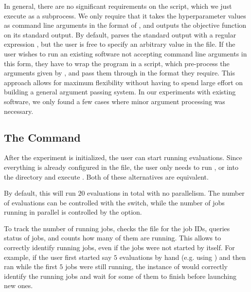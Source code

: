 In general, there are no significant requirements on the script, which we just execute as a subprocess. We only require that it takes the hyperparameter values as command line arguments in the format of , and outputs the objective function on its standard output. By default, \bopt parses the standard output with a regular expression , but the user is free to specify an arbitrary value in the  file. If the user wishes to run an existing software not accepting command line arguments in this form, they have to wrap the program in a script, which pre-process the arguments given by \bopt, and pass them through in the format they require. This approach allows for maximum flexibility without having to spend large effort on building a general argument passing system. In our experiments with existing software, we only found a few cases where minor argument processing was necessary.

\subsection{The  Command}

After the experiment is initialized, the user can start running evaluations. Since everything is already configured in the  file, the user only needs to run , or  into the directory and execute . Both of these alternatives are equivalent.

By default, this will run $20$ evaluations in total with no parallelism. The number of evaluations can be controlled with the  switch, while the number of jobs running in parallel is controlled by the  option.

To track the number of running jobs,  checks the  file for the job IDs, queries status of jobs, and counts how many of them are running. This allows  to correctly identify running jobs, even if the jobs were not started by  itself. For example, if the user first started say $5$ evaluations by hand (e.g. using ) and then ran  while the first $5$ jobs were still running, the instance of  would correctly identify the running jobs and wait for some of them to finish before launching new ones.

